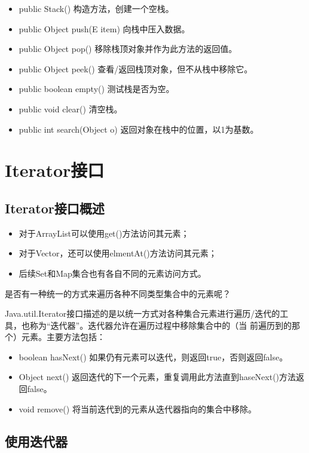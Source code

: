 \begin{itemize}
\item public Stack() 构造方法，创建一个空栈。
\item public Object push(E item) 向栈中压入数据。
\item public Object pop() 移除栈顶对象并作为此方法的返回值。
\item public Object peek() 查看/返回栈顶对象，但不从栈中移除它。
\item public boolean empty() 测试栈是否为空。
\item public void clear() 清空栈。
\item public int search(Object o) 返回对象在栈中的位置，以1为基数。
\end{itemize}

\section{Iterator接口}

\subsection{Iterator接口概述}

\begin{itemize}
\item 对于ArrayList可以使用get()方法访问其元素；
\item 对于Vector，还可以使用elmentAt()方法访问其元素；
\item 后续Set和Map集合也有各自不同的元素访问方式。
\end{itemize}

{\Blue\hei 是否有一种统一的方式来遍历各种不同类型集合中的元素呢？}

Java.util.Iterator接口描述的是以统一方式对各种集合元素进行遍历/迭代的工
具，也称为“{\Blue\hei 迭代器}”。迭代器允许在遍历过程中移除集合中的（当
前遍历到的那个）元素。主要方法包括：

\begin{itemize}
\item boolean hasNext() 如果仍有元素可以迭代，则返回true，否则返回false。
\item Object next() 返回迭代的下一个元素，重复调用此方法直到haseNext()方法返回false。
\item void remove() 将当前迭代到的元素从迭代器指向的集合中移除。
\end{itemize}

\subsection{使用迭代器}

